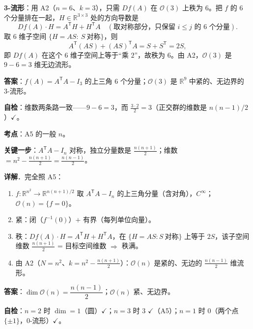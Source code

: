 \documentclass[11pt]{ctexart}
\renewcommand{\qbreak}{\needspace{0.22\textheight}}
\begin{document}
\textbf{3-流形}：用 A2（$n=6$、$k=3$），只需 $Df(A)$ 在 $\mathcal{O}(3)$ 上秩为 $6$。把 $f$ 的 6 个分量排在一起，$H\in\mathbb{R}^{3\times3}$ 处的方向导数是
\[ Df(A)\cdot H=A^{\mathsf T}H+H^{\mathsf T}A\quad(\text{取对称部分，只保留 } i\le j \text{ 的 6 个分量}). \]
取 6 维子空间 $\{H=AS:\ S\ \text{对称}\}$，则
\[ A^{\mathsf T}(AS)+(AS)^{\mathsf T}A=S+S^{\mathsf T}=2S, \]
即 $Df(A)$ 在这个 6 维子空间上等于“乘 $2$”，故秩为 $6$。由 A2，$\mathcal{O}(3)$ 是 $9-6=3$ 维无边流形。

\textbf{答案}：$f(A)=A^{\mathsf T}A-I_3$ 的上三角 6 个分量；$\mathcal{O}(3)$ 是 $\mathbb{R}^9$ 中紧的、无边界的 3-流形。

\textbf{自检}：维数两条路一致——$9-6=3$，而 $\frac{3\cdot2}{2}=3$（正交群的维数是 $n(n-1)/2$）$\checkmark$。

\qbreak
{}\label{ax6}

\textbf{考点}：A5 的一般 $n$。

\textbf{关键一步}：$A^{\mathsf T}A-I_n$ 对称，独立分量数是 $\frac{n(n+1)}{2}$；维数 $=n^2-\frac{n(n+1)}{2}=\frac{n(n-1)}{2}$。

\textbf{详解}．完全照 A5：
\begin{enumerate}
  \item $f:\mathbb{R}^{n^2}\to\mathbb{R}^{n(n+1)/2}$ 取 $A^{\mathsf T}A-I_n$ 的上三角分量（含对角），$C^\infty$；$\mathcal{O}(n)=\{f=0\}$。
  \item 紧：闭（$f^{-1}(0)$）$+$ 有界（每列单位向量）。
  \item 秩：$Df(A)\cdot H=A^{\mathsf T}H+H^{\mathsf T}A$，在 $\{H=AS:S\ \text{对称}\}$ 上等于 $2S$，该子空间维数 $\frac{n(n+1)}{2}$ = 目标空间维数 $\Rightarrow$ 秩满。
  \item 由 A2（$N=n^2$、$k=n^2-\frac{n(n+1)}{2}$）：$\mathcal{O}(n)$ 是紧的、无边的 $\frac{n(n-1)}{2}$ 维流形。
\end{enumerate}

\textbf{答案}：$\dim\mathcal{O}(n)=\dfrac{n(n-1)}{2}$；$\mathcal{O}(n)$ 紧、无边界。

\textbf{自检}：$n=2$ 时 $\dim=1$（圆）$\checkmark$；$n=3$ 时 $3$ $\checkmark$（A5）；$n=1$ 时 $0$（两个点 $\{\pm1\}$，0-流形）$\checkmark$。

\qbreak
{}\label{ax7}
\end{document}
